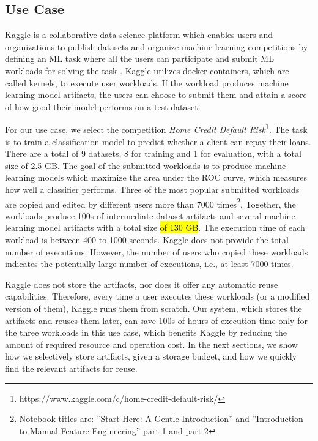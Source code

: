 \subsection{Use Case}\label{subsec-motivational-example}
Kaggle is a collaborative data science platform which enables users and organizations to publish datasets and organize machine learning competitions by defining an ML task where all the users can participate and submit ML workloads for solving the task \cite{kagglewebsite}.
Kaggle utilizes docker containers, which are called kernels, to execute user workloads.
If the workload produces machine learning model artifacts, the users can choose to submit them and attain a score of how good their model performs on a test dataset.

For our use case, we select the competition \textit{Home Credit Default Risk}\footnote{https://www.kaggle.com/c/home-credit-default-risk/}.
The task is to train a classification model to predict whether a client can repay their loans.
There are a total of 9 datasets, 8 for training and 1 for evaluation, with a total size of 2.5 GB.
The goal of the submitted workloads is to produce machine learning models which maximize the area under the ROC curve, which measures how well a classifier performs.
Three of the most popular submitted workloads are copied and edited by different users more than 7000 times\footnote{Notebook titles are: ''Start Here: A Gentle Introduction'' and ''Introduction to Manual Feature Engineering'' part 1 and part 2}.
Together, the workloads produce 100s of intermediate dataset artifacts and several machine learning model artifacts with a total size \hl{of 130 GB}.
The execution time of each workload is between 400 to 1000 seconds.
Kaggle does not provide the total number of executions.
However, the number of users who copied these workloads indicates the potentially large number of executions, i.e., at least 7000 times.

Kaggle does not store the artifacts, nor does it offer any automatic reuse capabilities.
Therefore, every time a user executes these workloads (or a modified version of them), Kaggle runs them from scratch.
Our system, which stores the artifacts and reuses them later, can save 100s of hours of execution time only for the three workloads in this use case, which benefits Kaggle by reducing the amount of required resource and operation cost.
In the next sections, we show how we selectively store artifacts, given a storage budget, and how we quickly find the relevant artifacts for reuse.